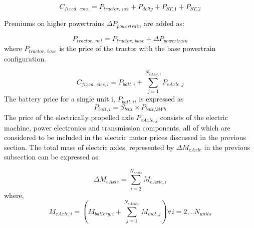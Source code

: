 \documentclass[ExampleMasters.tex]{subfiles}
\begin{document}
			\begin{equation}
				C_{fixed,\ conv} = P_{tractor,\ net}+P_{dolly}+P_{ST,1}+P_{ST,2}
			\end{equation}

			   Premiums on higher powertrains $\Delta P_{powertrain}$  are added as:
			
			\begin{equation}
				P_{tractor,\ net} = P_{tractor,\ base} + \Delta P_{powertrain}
			\end{equation}
			where $P_{tractor,\ base}$  is the price of the tractor with the base powertrain configuration. 

			\begin{equation}
				C_{fixed,\ elec, i} = P_{batt,i}+\displaystyle \sum_{j=1}^{N_{eAxle,i}} P_{eAxle,j}
			\end{equation}
			   The battery price for a single unit i, $P_{batt,i}$, is expressed as
			\begin{equation}
				P_{batt,i}= S_{batt} \times P_{batt/kWh}
			\end{equation}
			  The price of the electrically propelled axle $P_{eAxle,j}$ consists of the electric machine, power electronics and transmission components, all of which are considered to be included in the electric motor prices discussed in the previous section. The total mass of electric axles, represented by $\Delta M_{eAxle}$ in the previous subsection can be expressed as:

			\begin{equation}
				\Delta M_{eAxle} = \displaystyle \sum_{i=2}^{N_{units}} M_{eAxle,i}
			\end{equation}
			 where, 
			\begin{equation}
				M_{eAxle,i} = (M_{battery,i} + \sum_{j=1}^{N_{eAxle,i}} M_{mot,j}) \forall i=2,..N_{units}
			\end{equation}
\end{document}
